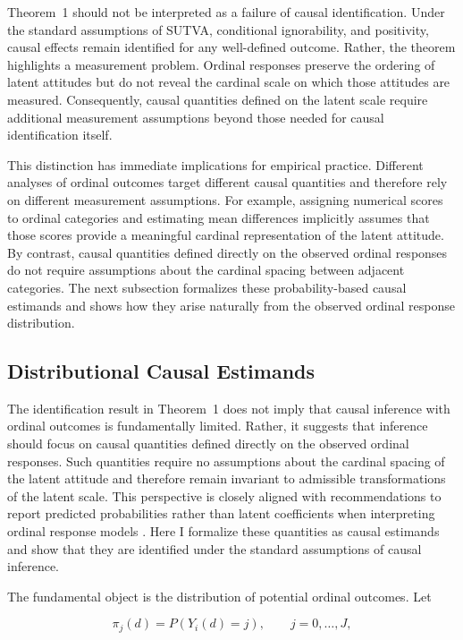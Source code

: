 \documentclass{article}
\begin{document}
Theorem~1 should not be interpreted as a failure of causal identification. Under the standard assumptions of SUTVA, conditional ignorability, and positivity, causal effects remain identified for any well-defined outcome. Rather, the theorem highlights a measurement problem. Ordinal responses preserve the ordering of latent attitudes but do not reveal the cardinal scale on which those attitudes are measured. Consequently, causal quantities defined on the latent scale require additional measurement assumptions beyond those needed for causal identification itself.

This distinction has immediate implications for empirical practice. Different analyses of ordinal outcomes target different causal quantities and therefore rely on different measurement assumptions. For example, assigning numerical scores to ordinal categories and estimating mean differences implicitly assumes that those scores provide a meaningful cardinal representation of the latent attitude. By contrast, causal quantities defined directly on the observed ordinal responses do not require assumptions about the cardinal spacing between adjacent categories. The next subsection formalizes these probability-based causal estimands and shows how they arise naturally from the observed ordinal response distribution.


\subsection{Distributional Causal Estimands}
\label{subsec:estimands}

The identification result in Theorem~1 does not imply that causal inference with ordinal outcomes is fundamentally limited. Rather, it suggests that inference should focus on causal quantities defined directly on the observed ordinal responses. Such quantities require no assumptions about the cardinal spacing of the latent attitude and therefore remain invariant to admissible transformations of the latent scale. This perspective is closely aligned with recommendations to report predicted probabilities rather than latent coefficients when interpreting ordinal response models \citep{Greene2010a, Hanmer2013a}. Here I formalize these quantities as causal estimands and show that they are identified under the standard assumptions of causal inference.

The fundamental object is the distribution of potential ordinal outcomes. Let

\[
\pi_j(d) = P\left( Y_i(d)=j \right),
\qquad j=0,\ldots,J,
\]
\end{document}
